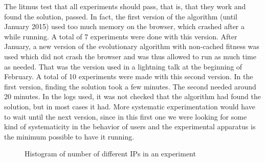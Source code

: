 \documentclass{sig-alternate}
\begin{document}
The litmus test that all experiments should pass, that is, that they
work and found the solution, passed. %
In fact, the first version of the
algorithm (until January 2015) used too much memory on the browser,
which crashed after a while running. A total of 7 experiments were
done with this version. After January, a new version of the
evolutionary algorithm with non-cached fitness was used which did not
crash the browser and was thus allowed to run as much time as
needed. That was the version used in a lightning talk at the beginning
of February. A total of 10 experiments were made with this second
version. In the first version, finding the solution took a few
minutes. The second needed around 20 minutes. In the logs used, it was
not checked that the algorithm had found the solution, but in most
cases it had. More systematic experimentation would have to wait until
the next version, since in this first one we were looking for some
kind of systematicity in the behavior of users and the experimental
apparatus is the minimum possible to have it running.
%
\begin{figure}[htb]
        \centering
        \caption{Histogram of number of different IPs in an experiment}\label{fig:histo:ips}
\end{figure}
\end{document}

